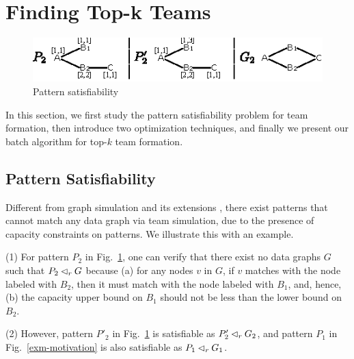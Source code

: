 \section{Finding Top-k Teams}
\label{sec-tsimAlg}


\begin{figure}[tb!]
	\begin{center}
		\includegraphics[scale=1.38]{./fig/consistency_motivation.eps}
	\end{center}
	\vspace{-3ex}
	\caption{Pattern satisfiability}
	\vspace{-4ex}
	\label{fig-consistency-example}
\end{figure}

In this section, we first study the pattern satisfiability problem for team formation, then introduce two optimization techniques, and finally we present our  batch algorithm for top-$k$ team formation.



\subsection{Pattern Satisfiability}
Different from graph simulation \cite{infsimu95} and its extensions \cite{FanLMTWW10,MaCFHW14},
there exist patterns that cannot match any data graph via team simulation, due to the presence of capacity constraints on patterns. We illustrate this with an example.

\begin{example}
\label{exm-consistency}
\ni(1) For pattern $P_2$ in Fig.~\ref{fig-consistency-example},
one can verify that there exist no data graphs $G$ such that $P_2 \lhd_r G$ because (a) for any nodes $v$ in $G$, if $v$ matches with the node labeled with $B_2$, then it must match with the node labeled with $B_1$, and, hence, (b) the capacity upper bound on $B_1$ should not be less than the lower bound on $B_2$.

\sstab(2) However, pattern $P'_2$ in Fig.~\ref{fig-consistency-example} is satisfiable as $P'_2 \lhd_r G_2$, and pattern $P_1$ in Fig.~\ref{exm-motivation} is also satisfiable as $P_1 \lhd_r G_1$.
\end{example}


